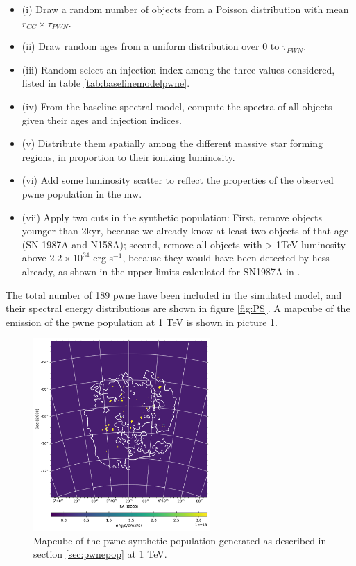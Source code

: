 \documentclass[main.tex]{subfiles}
\begin{document}
\begin{itemize}
\item (i) Draw a random number of objects from a Poisson distribution with mean $r_{CC} \times \tau_{PWN}$.
\item (ii) Draw random ages from a uniform distribution over 0 to $\tau_{PWN}$.
\item(iii) Random select an injection index among the three values considered, listed in table \ref{tab:baselinemodelpwne}.
\item (iv) From the baseline spectral model, compute the spectra of all objects given their ages and injection indices.
\item (v) Distribute them spatially among the different massive star forming regions, in proportion to their ionizing luminosity.
\item(vi) Add some luminosity scatter to reflect the properties of the observed \gls{pwne} population in the \gls{mw}.
  \item(vii) Apply two cuts in the synthetic population: First, remove objects younger than 2kyr, because we already know at least two objects of that age (SN 1987A and N158A); second, remove all objects with > 1TeV luminosity above $2.2 \times 10^{34}$ erg s$^{-1}$, because they would have been detected by \gls{hess} already, as shown in the upper limits calculated for SN1987A in \cite{2012HESSLMC}. 
\end{itemize}

The total number of 189 \gls{pwne} have been included in the simulated model, and their spectral energy distributions are shown in figure \ref{fig:PS}. A mapcube of the emission of the \gls{pwne} population at 1 TeV is shown in picture \ref{fig:mapcube_pwne}.


\begin{figure}[h]
  \centering
  \includegraphics[width=0.6\textwidth]{Pictures/PWNe_1TeVmap.pdf}
  \caption{\label{fig:mapcube_pwne} Mapcube of the \gls{pwne} synthetic population generated as described in section \ref{sec:pwnepop} at 1 TeV.}
\end{figure}
\end{document}
